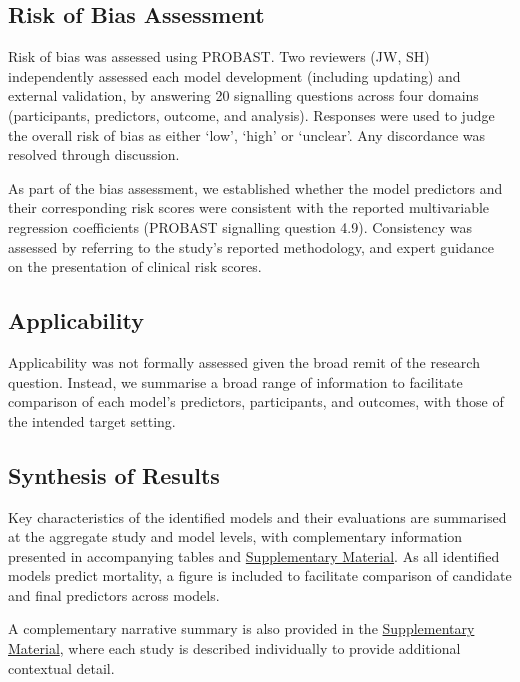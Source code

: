 \subsection{Risk of Bias Assessment}

Risk of bias was assessed using PROBAST\cite{wolffPROBASTToolAssess2019,moons2019}. Two reviewers (JW, SH) independently assessed each model development (including updating) and external validation, by answering 20 signalling questions across four domains (participants, predictors, outcome, and analysis). Responses were used to judge the overall risk of bias as either `low', `high' or `unclear'. Any discordance was resolved through discussion.

As part of the bias assessment, we established whether the model predictors and their corresponding risk scores were consistent with the reported multivariable regression coefficients (PROBAST signalling question 4.9). Consistency was assessed by referring to the study's reported methodology, and expert guidance on the presentation of clinical risk scores\cite{bonnettGuidePresentingClinical2019}.

\subsection{Applicability}

Applicability was not formally assessed given the broad remit of the research question. Instead, we summarise a broad range of information to facilitate comparison of each model's predictors, participants, and outcomes, with those of the intended target setting\cite{moons2019}.

\subsection{Synthesis of Results}

Key characteristics of the identified models and their evaluations are summarised at the aggregate study and model levels, with complementary information presented in accompanying tables and \href{https://github.com/jpwil/dphil}{Supplementary Material}. As all identified models predict mortality, a figure is included to facilitate comparison of candidate and final predictors across models.

A complementary narrative summary is also provided in the \href{https://github.com/jpwil/dphil}{Supplementary Material}, where each study is described individually to provide additional contextual detail.

